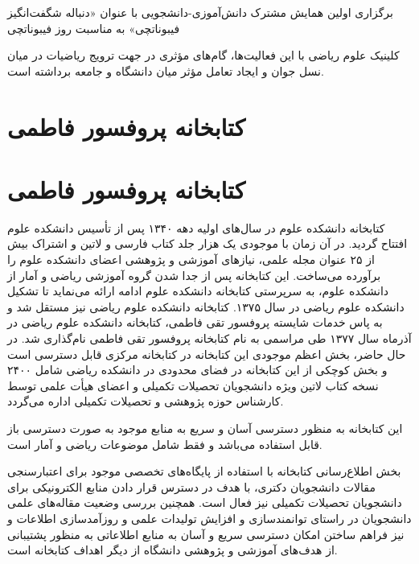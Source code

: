 \documentclass[
  letterpaper,
  DIV=11,
  numbers=noendperiod]{scrreprt}
\begin{document}
برگزاری اولین همایش مشترک دانش‌آموزی-دانشجویی با عنوان «دنباله شگفت‌انگیز
فیبوناتچی» به مناسبت روز فیبوناتچی

کلینیک علوم ریاضی با این فعالیت‌ها، گام‌های مؤثری در جهت ترویج ریاضیات در
میان نسل جوان و ایجاد تعامل مؤثر میان دانشگاه و جامعه برداشته است.


\chapter{کتابخانه پروفسور
فاطمی}\label{ux6a9ux62aux627ux628ux62eux627ux646ux647-ux67eux631ux648ux641ux633ux648ux631-ux641ux627ux637ux645ux6cc}


\chapter{کتابخانه پروفسور
فاطمی}\label{ux6a9ux62aux627ux628ux62eux627ux646ux647-ux67eux631ux648ux641ux633ux648ux631-ux641ux627ux637ux645ux6cc-1}

کتابخانه دانشکده علوم در سال‌های اولیه دهه ۱۳۴۰ پس از تأسیس دانشکده علوم
افتتاح گردید. در آن زمان با موجودی یک هزار جلد کتاب فارسی و لاتین و
اشتراک بیش از ۲۵ عنوان مجله علمی، نیازهای آموزشی و پژوهشی اعضای دانشکده
علوم را برآورده می‌ساخت. این کتابخانه پس از جدا شدن گروه آموزشی ریاضی و
آمار از دانشکده علوم، به سرپرستی کتابخانه دانشکده علوم ادامه ارائه
می‌نماید تا تشکیل دانشکده علوم ریاضی در سال ۱۳۷۵. کتابخانه دانشکده علوم
ریاضی نیز مستقل شد و به پاس خدمات شایسته پروفسور تقی فاطمی، کتابخانه
دانشکده علوم ریاضی در آذرماه سال ۱۳۷۷ طی مراسمی به نام کتابخانه پروفسور
تقی فاطمی نام‌گذاری شد. در حال حاضر، بخش اعظم موجودی این کتابخانه در
کتابخانه مرکزی قابل دسترسی است و بخش کوچکی از این کتابخانه در فضای
محدودی در دانشکده ریاضی شامل ۲۴۰۰ نسخه کتاب لاتین ویژه دانشجویان تحصیلات
تکمیلی و اعضای هیأت علمی توسط کارشناس حوزه پژوهشی و تحصیلات تکمیلی اداره
می‌گردد.

این کتابخانه به منظور دسترسی آسان و سریع به منابع موجود به صورت دسترسی
باز قابل استفاده می‌باشد و فقط شامل موضوعات ریاضی و آمار است.

بخش اطلاع‌رسانی کتابخانه با استفاده از پایگاه‌های تخصصی موجود برای
اعتبارسنجی مقالات دانشجویان دکتری، با هدف در دسترس قرار دادن منابع
الکترونیکی برای دانشجویان تحصیلات تکمیلی نیز فعال است. همچنین بررسی
وضعیت مقاله‌های علمی دانشجویان در راستای توانمندسازی و افزایش تولیدات
علمی و روزآمدسازی اطلاعات و نیز فراهم ساختن امکان دسترسی سریع و آسان به
منابع اطلاعاتی به منظور پشتیبانی از هدف‌های آموزشی و پژوهشی دانشگاه از
دیگر اهداف کتابخانه است.
\end{document}
